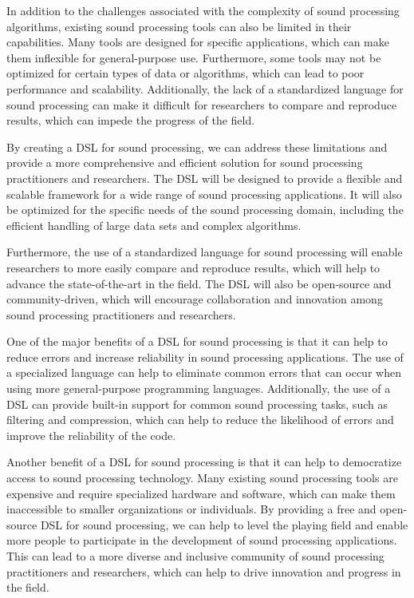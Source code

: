 In addition to the challenges associated with the complexity of sound processing algorithms, existing sound processing tools can also be limited in their capabilities. Many tools are designed for specific applications, which can make them inflexible for general-purpose use. Furthermore, some tools may not be optimized for certain types of data or algorithms, which can lead to poor performance and scalability. Additionally, the lack of a standardized language for sound processing can make it difficult for researchers to compare and reproduce results, which can impede the progress of the field.

By creating a DSL for sound processing, we can address these limitations and provide a more comprehensive and efficient solution for sound processing practitioners and researchers. The DSL will be designed to provide a flexible and scalable framework for a wide range of sound processing applications. It will also be optimized for the specific needs of the sound processing domain, including the efficient handling of large data sets and complex algorithms.

Furthermore, the use of a standardized language for sound processing will enable researchers to more easily compare and reproduce results, which will help to advance the state-of-the-art in the field. The DSL will also be open-source and community-driven, which will encourage collaboration and innovation among sound processing practitioners and researchers.

One of the major benefits of a DSL for sound processing is that it can help to reduce errors and increase reliability in sound processing applications. The use of a specialized language can help to eliminate common errors that can occur when using more general-purpose programming languages. Additionally, the use of a DSL can provide built-in support for common sound processing tasks, such as filtering and compression, which can help to reduce the likelihood of errors and improve the reliability of the code.

Another benefit of a DSL for sound processing is that it can help to democratize access to sound processing technology. Many existing sound processing tools are expensive and require specialized hardware and software, which can make them inaccessible to smaller organizations or individuals. By providing a free and open-source DSL for sound processing, we can help to level the playing field and enable more people to participate in the development of sound processing applications. This can lead to a more diverse and inclusive community of sound processing practitioners and researchers, which can help to drive innovation and progress in the field.

